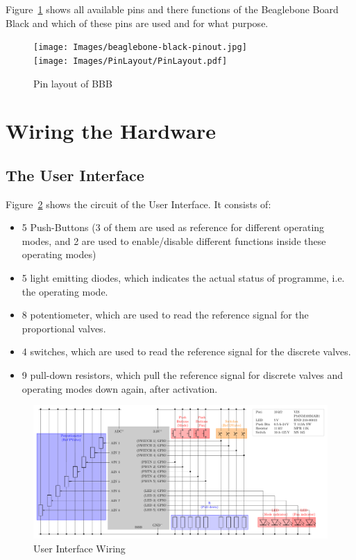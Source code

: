 \documentclass[
	fontsize=10pt
	paper=a4
]{scrartcl}
\begin{document}
Figure~\ref{fig:BBBpins} shows all available pins and there functions of the Beaglebone Board Black and which of these pins are used and for what purpose.
\begin{figure}[h!]
\begin{center}
\texttt{[image: Images/beaglebone-black-pinout.jpg]} \\
\texttt{[image: Images/PinLayout/PinLayout.pdf]}
\caption{Pin layout of BBB}
\label{fig:BBBpins}
\end{center}
\end{figure}


\section{Wiring the Hardware}

\subsection{The User Interface}

Figure~\ref{fig:hui_circuit} shows the circuit of the User Interface. 
It consists of:
\begin{itemize}
	\item 5 Push-Buttons (3 of them are used as reference for different operating modes, and 2 are used to enable/disable different functions inside these operating modes)
	\item 5 light emitting diodes, which indicates the actual status of programme, i.e. the operating mode.
	\item 8 potentiometer, which are used to read the reference signal for the proportional valves.
	\item 4 switches, which are used to read the reference signal for the discrete valves.
	\item 9 pull-down resistors, which pull the reference signal for discrete valves and operating modes down again, after activation.
\end{itemize}

\begin{figure}[h!]
\begin{center}
\includegraphics[width=.98\textwidth]{Images/circuit_HUI/circuit_HUI.pdf}
\caption{User Interface Wiring}
\label{fig:hui_circuit}
\end{center}
\end{figure}
\end{document}
